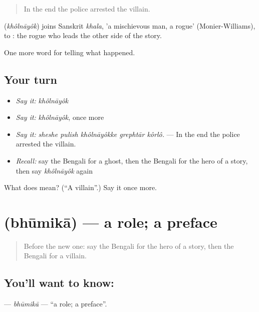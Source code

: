 \begin{quote}
In the end the police arrested the villain.
\end{quote}

\begin{cousinweb}
\textbf{} (\emph{khôlnāyôk}) joins Sanskrit \emph{khala}, 'a mischievous man, a rogue' (Monier-Williams), to \textbf{}: the rogue who leads the other side of the story.
\end{cousinweb}

\begin{grammarlens}[title={What you've built}]
One more word for telling what happened.
\end{grammarlens}

\subsection*{Your turn}
\begin{itemize}
\raggedright
  \item \emph{Say it:} \emph{khôlnāyôk}
  \item \emph{Say it:} \emph{khôlnāyôk}, once more
  \item \emph{Say it:} \emph{sheshe pulish khôlnāyôkke grephtār kôrlô.} — In the end the police arrested the villain.
  \item \emph{Recall:} say the Bengali for a ghost, then the Bengali for the hero of a story, then say \emph{khôlnāyôk} again
\end{itemize}

\begin{tcolorbox}[breakable,colback=teal!4,colframe=teal!35!black,title={Before you move on}]
What does  mean? (\textquotedblleft{}A villain\textquotedblright{}.) Say it once more.
\end{tcolorbox}
\section[\texorpdfstring{\bn{ভূমিকা} (bhūmikā)}{ভূমিকা (bhūmikā)}]{ (bhūmikā) — a role; a preface}

\label{lesson:BN-C323-bhumika}



\begin{quote}
Before the new one: say the Bengali for the hero of a story, then the Bengali for a villain.
\end{quote}

\subsection*{You'll want to know: }
\textbf{} — \emph{bhūmikā} — \textquotedblleft{}a role; a preface\textquotedblright{}.

